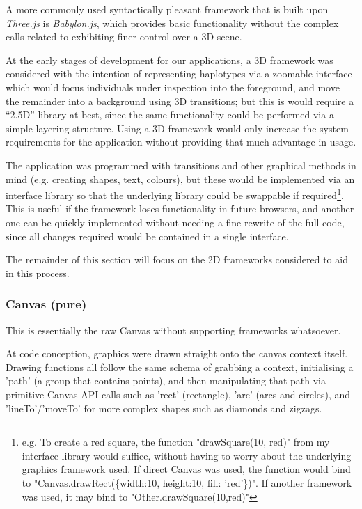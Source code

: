 A more commonly used syntactically pleasant framework that is built upon \textit{Three.js} is \textit{Babylon.js}, which provides basic functionality without the complex calls related to exhibiting finer control over a 3D scene.

At the early stages of development for our applications, a 3D framework was considered  with the intention of representing haplotypes via a zoomable interface which would focus individuals under inspection into the foreground, and move the remainder into a background using 3D transitions; but this is would require a “2.5D” library at best, since the same functionality could be performed via a simple layering structure. Using a 3D framework would only increase the system requirements for the application without providing that much advantage in usage.

The application was programmed with transitions and other graphical methods in mind (e.g. creating shapes, text, colours), but these would be implemented via an interface library so that the underlying library could be swappable if required\footnote{e.g. To create a red square, the function "drawSquare(10, red)" from my interface library would suffice, without having to worry about the underlying graphics framework used. If direct Canvas was used, the function would bind to "Canvas.drawRect(\{width:10, height:10, fill: 'red'\})". If another framework was used, it may bind to "Other.drawSquare(10,red)"}. This is useful if the framework loses functionality in future browsers, and another one can be quickly implemented without needing a fine rewrite of the full code, since all changes required would be contained in a single interface.

The remainder of this section will focus on the 2D frameworks considered to aid in this process.


\subsubsection{Canvas (pure)}

This is essentially the raw Canvas without supporting frameworks whatsoever.  

At code conception, graphics were drawn straight onto the canvas context itself. Drawing functions all follow the same schema of grabbing a context, initialising a 'path' (a group that contains points), and then manipulating that path via primitive Canvas API calls such as 'rect' (rectangle), 'arc' (arcs and circles), and 'lineTo'/'moveTo' for more complex shapes such as diamonds and zigzags. 

